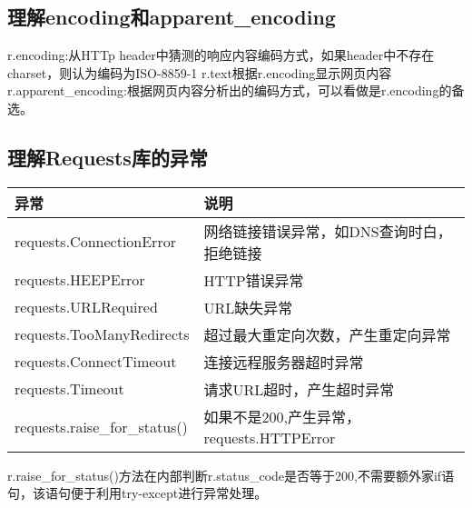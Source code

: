 \subsection{理解encoding和apparent\_encoding}
r.encoding:从HTTp header中猜测的响应内容编码方式，如果header中不存在charset，则认为编码为ISO-8859-1 r.text根据r.encoding显示网页内容\newline
r.apparent\_encoding:根据网页内容分析出的编码方式，可以看做是r.encoding的备选。\newline
\subsection{理解Requests库的异常}
\begin{center}
\begin{tabular}{|p{4.5cm}|p{12cm}|}
\hline
异常&说明\\
\hline
requests.ConnectionError&网络链接错误异常，如DNS查询时白，拒绝链接\\
\hline
requests.HEEPError&HTTP错误异常\\
\hline
requests.URLRequired&URL缺失异常\\
\hline
requests.TooManyRedirects&超过最大重定向次数，产生重定向异常\\
\hline
requests.ConnectTimeout&连接远程服务器超时异常\\
\hline
requests.Timeout&请求URL超时，产生超时异常\\
\hline
requests.raise\_for\_status()&如果不是200,产生异常，requests.HTTPError\\
\hline
\end{tabular}
\end{center}
r.raise\_for\_status()方法在内部判断r.status\_code是否等于200,不需要额外家if语句，该语句便于利用try-except进行异常处理。
